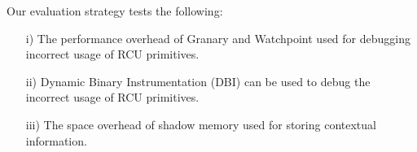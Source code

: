 Our evaluation strategy tests the following:
\begin{enumerate}
	\item[i)] The performance overhead of Granary and Watchpoint used for debugging incorrect usage of RCU primitives.
	\item[ii)] Dynamic Binary Instrumentation (DBI) can be used to debug the incorrect usage of RCU primitives.
	\item[iii)] The space overhead of shadow memory used for storing contextual information.
\end{enumerate}

